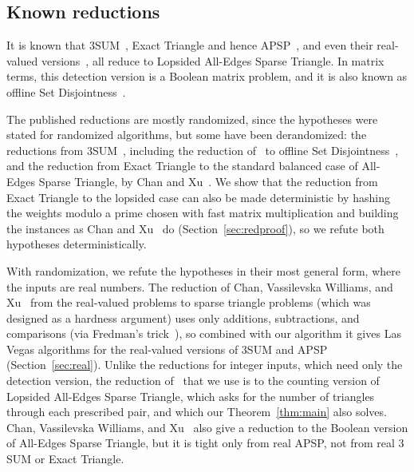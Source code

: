 \subsection{Known reductions} \label{Sec:introknown}
It is known that $3$SUM~\cite{Pat10,KPP16}, Exact Triangle and hence APSP~\cite{VX20a}, and even their real-valued versions~\cite{CVX22}, all reduce to Lopsided All-Edges Sparse Triangle. In matrix terms, this detection version is a Boolean matrix problem, and it is also known as offline Set Disjointness~\cite{KPP16,VX20a}. 

The published reductions are mostly randomized, since the hypotheses were stated for randomized algorithms, but some have been derandomized: the reductions from $3$SUM~\cite{CH20,FKP24}, including the reduction of~\cite{KPP16} to offline Set Disjointness~\cite[Theorem~1.4]{FKP24}, and the reduction from Exact Triangle to the standard balanced case of All-Edges Sparse Triangle, by Chan and Xu~\cite{CX24}. We show that the reduction from Exact Triangle to the lopsided case can also be made deterministic by hashing the weights modulo a prime chosen with fast matrix multiplication and building the instances as Chan and Xu~\cite{CX24} do (Section~\ref{sec:redproof}), so we refute both hypotheses deterministically.

With randomization, we refute the hypotheses in their most general form, where the inputs are real numbers. The reduction of Chan, Vassilevska Williams, and Xu~\cite{CVX22} from the real-valued problems to sparse triangle problems (which was designed as a hardness argument) uses only additions, subtractions, and comparisons (via Fredman's trick~\cite{Fre76}), so combined with our algorithm it gives Las Vegas algorithms for the real-valued versions of $3$SUM and APSP (Section~\ref{sec:real}). Unlike the reductions for integer inputs, which need only the detection version, the reduction of~\cite{CVX22} that we use is to the counting version of Lopsided All-Edges Sparse Triangle, which asks for the number of triangles through each prescribed pair, and which our Theorem~\ref{thm:main} also solves. Chan, Vassilevska Williams, and Xu~\cite{CVX22} also give a reduction to the Boolean version of All-Edges Sparse Triangle, but it is tight only from real APSP, not from real $3$SUM or Exact Triangle.


